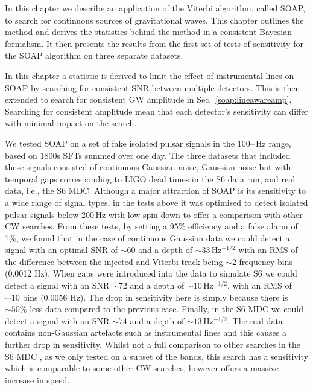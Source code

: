 In this chapter we describe an application of the Viterbi algorithm, called SOAP,
to search for continuous sources of gravitational waves.  This chapter outlines
the method and derives the statistics behind the method in a consistent
Bayesian formalism. It then presents the results from the first set of tests of
sensitivity for the SOAP algorithm on three separate datasets.


In this chapter a statistic is derived to limit the effect of instrumental lines on SOAP by searching for consistent \gls{SNR} between multiple detectors.
This is then extended to search for consistent \gls{GW} amplitude in Sec.~\ref{soap:lineawareamp}.
Searching for consistent amplitude mean that each detector's sensitivity can differ with minimal impact on the search.

%
%
We tested SOAP on a set of fake isolated pulsar signals in the
100\;--\,Hz range, based on 1800s \glspl{SFT} summed over one day.
The three datasets that included these signals consisted of continuous Gaussian noise, Gaussian noise but with temporal gaps corresponding to \gls{LIGO} dead times in the S6 data run, and real data, i.e., the
S6 \gls{MDC}. Although a major attraction of SOAP is its sensitivity to a wide
range of signal types, in the tests above it was optimised to detect isolated pulsar signals below 200\,Hz with low spin-down to offer a comparison with other \gls{CW} searches. From these tests, by setting a
95\% efficiency and a false alarm of 1\%, we found that in the case of  continuous Gaussian data we could detect a signal with an optimal \gls{SNR} of $\sim 60$ and a
depth of $\sim 33$\,Hz$^{-1/2}$ with an \gls{RMS} of the difference between the injected and Viterbi track being $\sim 2$ frequency bins (0.0012 Hz).
When gaps were introduced into the data to simulate S6 we could detect a signal with an
\gls{SNR} $\sim 72$  and a depth of $\sim 10$\,Hz$^{-1/2}$, with an \gls{RMS} of $\sim 10$ bins (0.0056 Hz). The drop in sensitivity here is simply because  there is $\sim 50 \%$ less data compared to the previous case. Finally, in the S6 \gls{MDC} we could
detect a signal with an \gls{SNR} $\sim 74$ and a depth of $\sim
13$\,Hz$^{-1/2}$.
The real data contains non-Gaussian artefacts such as instrumental lines and this causes a further drop in sensitivity.
Whilst not a full comparison to other searches in the S6 \gls{MDC} \citep{walsh2016ComparisonMethods}, as we only tested on a subset
of the bands, this search has a sensitivity which is comparable to some other \gls{CW} searches, however offers a massive increase in speed.

